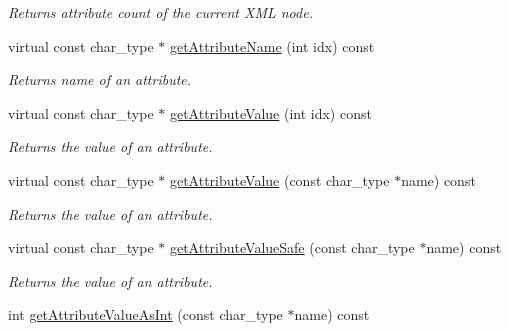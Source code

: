 \begin{DoxyCompactItemize}
\begin{DoxyCompactList}\small\item\em Returns attribute count of the current X\-M\-L node. \end{DoxyCompactList}\item 
\hypertarget{classirr_1_1io_1_1_c_x_m_l_reader_impl_afc1f65d70219634fc005a6048f898fb3}{virtual const char\-\_\-type $\ast$ \hyperlink{classirr_1_1io_1_1_c_x_m_l_reader_impl_afc1f65d70219634fc005a6048f898fb3}{get\-Attribute\-Name} (int idx) const }\label{classirr_1_1io_1_1_c_x_m_l_reader_impl_afc1f65d70219634fc005a6048f898fb3}

\begin{DoxyCompactList}\small\item\em Returns name of an attribute. \end{DoxyCompactList}\item 
\hypertarget{classirr_1_1io_1_1_c_x_m_l_reader_impl_a55bc001ac65fa308a04b65bc1529aa4b}{virtual const char\-\_\-type $\ast$ \hyperlink{classirr_1_1io_1_1_c_x_m_l_reader_impl_a55bc001ac65fa308a04b65bc1529aa4b}{get\-Attribute\-Value} (int idx) const }\label{classirr_1_1io_1_1_c_x_m_l_reader_impl_a55bc001ac65fa308a04b65bc1529aa4b}

\begin{DoxyCompactList}\small\item\em Returns the value of an attribute. \end{DoxyCompactList}\item 
\hypertarget{classirr_1_1io_1_1_c_x_m_l_reader_impl_a7252bf5d02f9cc05ade31e658502116a}{virtual const char\-\_\-type $\ast$ \hyperlink{classirr_1_1io_1_1_c_x_m_l_reader_impl_a7252bf5d02f9cc05ade31e658502116a}{get\-Attribute\-Value} (const char\-\_\-type $\ast$name) const }\label{classirr_1_1io_1_1_c_x_m_l_reader_impl_a7252bf5d02f9cc05ade31e658502116a}

\begin{DoxyCompactList}\small\item\em Returns the value of an attribute. \end{DoxyCompactList}\item 
\hypertarget{classirr_1_1io_1_1_c_x_m_l_reader_impl_af8ff476656b98b9f491b453c8093b77b}{virtual const char\-\_\-type $\ast$ \hyperlink{classirr_1_1io_1_1_c_x_m_l_reader_impl_af8ff476656b98b9f491b453c8093b77b}{get\-Attribute\-Value\-Safe} (const char\-\_\-type $\ast$name) const }\label{classirr_1_1io_1_1_c_x_m_l_reader_impl_af8ff476656b98b9f491b453c8093b77b}

\begin{DoxyCompactList}\small\item\em Returns the value of an attribute. \end{DoxyCompactList}\item 
\hypertarget{classirr_1_1io_1_1_c_x_m_l_reader_impl_a5d532267e6e4ac8fcb402671842c32c9}{int \hyperlink{classirr_1_1io_1_1_c_x_m_l_reader_impl_a5d532267e6e4ac8fcb402671842c32c9}{get\-Attribute\-Value\-As\-Int} (const char\-\_\-type $\ast$name) const }\label{classirr_1_1io_1_1_c_x_m_l_reader_impl_a5d532267e6e4ac8fcb402671842c32c9}


\end{DoxyCompactItemize}

